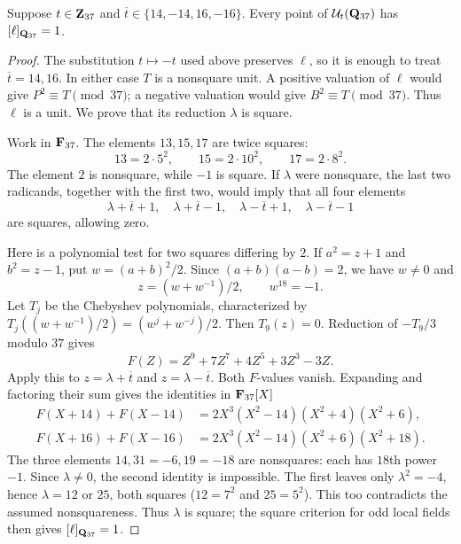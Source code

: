 \begin{lemma}\label{lem:common-37}
Suppose $t\in\mathbf Z_{37}$ and
$\overline t\in\{14,-14,16,-16\}$.  Every point of
$\mathcal U_t(\mathbf Q_{37})$ has $[\ell]_{\mathbf Q_{37}}=1$.
\end{lemma}
\begin{proof}
The substitution $t\mapsto-t$ used above preserves $\ell$, so it is enough
to treat $\overline t=14,16$.  In either case $T$ is a nonsquare unit.
A positive valuation of $\ell$ would give $P^2\equiv T\pmod{37}$;
a negative valuation would give $B^2\equiv T\pmod{37}$.
Thus $\ell$ is a unit.  We prove that its reduction $\lambda$ is square.

Work in $\mathbf F_{37}$.  The elements $13,15,17$ are twice squares:
\[
 13=2\cdot5^2,\qquad15=2\cdot10^2,\qquad17=2\cdot8^2.
\]
The element $2$ is nonsquare, while $-1$ is square.
If $\lambda$ were nonsquare, the last two radicands, together with the
first two, would imply that all four elements
\[
 \lambda+\overline t+1,\quad\lambda+\overline t-1,
 \quad\lambda-\overline t+1,\quad\lambda-\overline t-1
\]
are squares, allowing zero.

Here is a polynomial test for two squares differing by $2$.
If $a^2=z+1$ and $b^2=z-1$, put $w=(a+b)^2/2$.
Since $(a+b)(a-b)=2$, we have $w\ne0$ and
\[
 z=(w+w^{-1})/2,\qquad w^{18}=-1.
\]
Let $T_j$ be the Chebyshev polynomials, characterized by
$T_j((w+w^{-1})/2)=(w^j+w^{-j})/2$.
Then $T_9(z)=0$.  Reduction of $-T_9/3$ modulo $37$ gives
\[
 F(Z)=Z^9+7Z^7+4Z^5+3Z^3-3Z.
\]
Apply this to $z=\lambda+\overline t$ and
$z=\lambda-\overline t$.  Both $F$-values vanish.  Expanding and
factoring their sum gives the identities in $\mathbf F_{37}[X]$
\begin{align*}
 F(X+14)+F(X-14)&=2X^3(X^2-14)(X^2+4)(X^2+6),\\
 F(X+16)+F(X-16)&=2X^3(X^2-14)(X^2+6)(X^2+18).
\end{align*}
The three elements $14,31=-6,19=-18$ are nonsquares: each has
$18$th power $-1$.  Since $\lambda\ne0$, the second identity is
impossible.  The first leaves only $\lambda^2=-4$, hence
$\lambda=12$ or $25$, both squares ($12=7^2$ and $25=5^2$).
This too contradicts the assumed nonsquareness.
Thus $\lambda$ is square; the square criterion for odd local fields
then gives $[\ell]_{\mathbf Q_{37}}=1$.
\end{proof}

